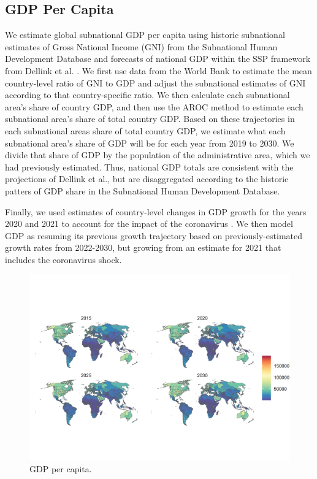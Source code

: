 \documentclass{article}
\begin{document}
\subsection{GDP Per Capita}
We estimate global subnational GDP per capita using historic subnational estimates of Gross National Income (GNI) from the Subnational Human Development Database \cite{Smits2019} and forecasts of national GDP within the SSP framework from Dellink et al. \cite{Dellink2017}.  We first use data from the World Bank to estimate the mean country-level ratio of GNI to GDP and adjust the subnational estimates of GNI according to that country-specific ratio.  We then calculate each subnational area's share of country GDP, and then use the AROC method to estimate each subnational area's share of total country GDP.  Based on these trajectories in each subnational areas share of total country GDP, we estimate what each subnational area's share of GDP will be for each year from 2019 to 2030.  We divide that share of GDP by the population of the administrative area, which we had previously estimated.  Thus, national GDP totals are consistent with the projections of Dellink et al., but are disaggregated according to the historic patters of GDP share in the Subnational Human Development Database.

Finally, we used estimates of country-level changes in GDP growth for the years 2020 and 2021 to account for the impact of the coronavirus \citep{prospects2020}.  We then model GDP as resuming its previous growth trajectory based on previously-estimated growth rates from 2022-2030, but growing from an estimate for 2021 that includes the coronavirus shock.

\begin{figure}[H]
  \centering
  \includegraphics[width=\linewidth]{img/covars/gdp_percap.png}
  \caption{GDP per capita.}
\end{figure}
\end{document}
